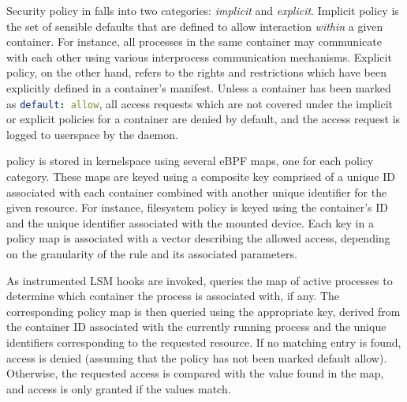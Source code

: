 Security policy in \bpfcontain{} falls into two categories: \textit{implicit}
and \textit{explicit}.  Implicit policy is the set of sensible defaults that are
defined to allow interaction \textit{within} a given container. For instance,
all processes in the same container may communicate with each other using
various interprocess communication mechanisms. Explicit policy, on the other
hand, refers to the rights and restrictions which have been explicitly defined
in a container's manifest. Unless a container has been marked as
\lstinline[language=yaml]|default: allow|, all access requests which are not
covered under the implicit or explicit policies for a container are denied by
default, and the access request is logged to userspace by the \bpfcontain{}
daemon.

\bpfcontain{} policy is stored in kernelspace using several eBPF maps, one for
each policy category. These maps are keyed using a composite key comprised of
a unique ID associated with each container combined with another unique
identifier for the given resource. For instance, filesystem policy is
keyed using the container's ID and the unique identifier associated with the
mounted device. Each key in a policy map is associated with a vector describing
the allowed access, depending on the granularity of the rule and its associated
parameters.

As instrumented LSM hooks are invoked, \bpfcontain{} queries the map of active
processes to determine which container the process is associated with, if any.
The corresponding policy map is then queried using the appropriate key, derived
from the container ID associated with the currently running process and the
unique identifiers corresponding to the requested resource. If no matching entry
is found, access is denied (assuming that the policy has not been marked default
allow).  Otherwise, the requested access is compared with the value found in the
map, and access is only granted if the values match.

